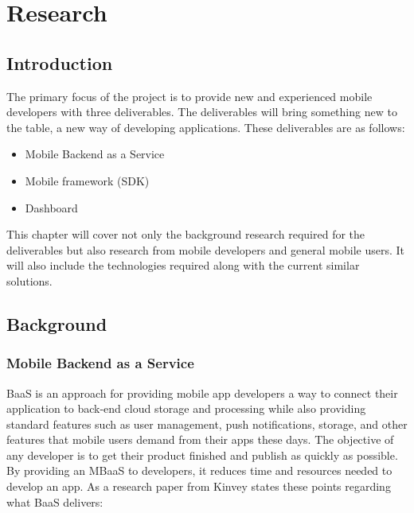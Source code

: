 \chapter{Research}

\label{ch:background}

\section{Introduction}

The primary focus of the project is to provide new and experienced mobile developers with three deliverables. The deliverables will bring something new to the table, a new way of developing applications. These deliverables are as follows:

\begin{itemize}
  \item Mobile Backend as a Service
  \item Mobile framework (SDK)
  \item Dashboard
\end{itemize}

This chapter will cover not only the background research required for the deliverables but also research from mobile developers and general mobile users. It will also include the technologies required along with the current similar solutions.

\section{Background}

\subsection{Mobile Backend as a Service}

BaaS is an approach for providing mobile app developers a way to connect their application to back-end cloud storage and processing while also providing standard features such as user management, push notifications, storage, and other features that mobile users demand from their apps these days. The objective of any developer is to get their product finished and publish as quickly as possible. By providing an MBaaS to developers, it reduces time and resources needed to develop an app. As a research paper from Kinvey \cite{kinveywebsite} states these points regarding what BaaS delivers:

